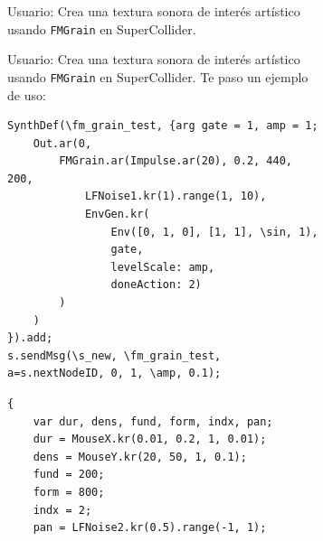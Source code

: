 \begin{figure}%
    \caption[]{Comparación de resultados de ChatGPT con (a) \textit{Zero-shot} y (b) \textit{Few-shot}.}
    \centering
    \begin{subfigure}{.48\textwidth}
      \centering
      \begin{mdframed}
        Usuario: Crea una textura sonora de interés artístico usando \texttt{FMGrain} en SuperCollider.
      \end{mdframed}
    \end{subfigure}\hfill
    \begin{subfigure}{.48\textwidth}
      \centering
      \begin{mdframed}
        Usuario: Crea una textura sonora de interés artístico usando \texttt{FMGrain} en SuperCollider. Te paso un ejemplo de uso:
        \begin{lstlisting}[style=SuperCollider-IDE, basicstyle=\footnotesize\ttfamily, numbers=none]
SynthDef(\fm_grain_test, {arg gate = 1, amp = 1;
    Out.ar(0,
        FMGrain.ar(Impulse.ar(20), 0.2, 440, 200,
            LFNoise1.kr(1).range(1, 10),
            EnvGen.kr(
                Env([0, 1, 0], [1, 1], \sin, 1),
                gate,
                levelScale: amp,
                doneAction: 2)
        )
    )
}).add;
s.sendMsg(\s_new, \fm_grain_test, a=s.nextNodeID, 0, 1, \amp, 0.1);
        \end{lstlisting}
      \end{mdframed}
    \end{subfigure}

    \vspace{0.2cm}

    \begin{subfigure}{.48\textwidth}
        \centering
        \begin{lstlisting}[style=SuperCollider-IDE, basicstyle=\footnotesize\ttfamily, numbers=none]
{
    var dur, dens, fund, form, indx, pan;
    dur = MouseX.kr(0.01, 0.2, 1, 0.01); 
    dens = MouseY.kr(20, 50, 1, 0.1);
    fund = 200;                     
    form = 800;
    indx = 2;
    pan = LFNoise2.kr(0.5).range(-1, 1); 


\end{lstlisting}
\end{subfigure}
\end{figure}
